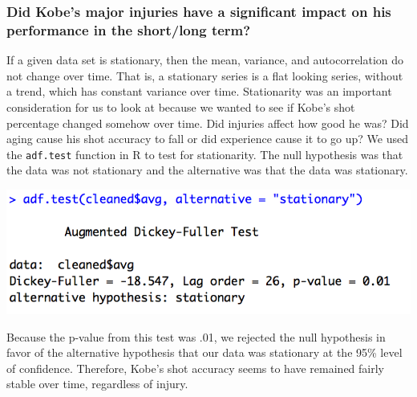 \documentclass[paper=a4, fontsize=11pt]{scrartcl} %
\numberwithin{equation}{section} %
\numberwithin{figure}{section} %
\numberwithin{table}{section} %
\begin{document}
\subsubsection{Did Kobe's major injuries have a significant impact on his performance in the short/long term?}
\hspace*{1cm}If a given data set is stationary, then the mean, variance, and autocorrelation do not change over time. That is, a stationary series is a flat looking series, without a trend, which has constant variance over time. Stationarity was an important consideration for us to look at because we wanted to see if Kobe's shot percentage changed somehow over time. Did injuries affect how good he was? Did aging cause his shot accuracy to fall or did experience cause it to go up? We used the \texttt{adf.test} function in R to test for stationarity. The null hypothesis was that the data was not stationary and the alternative was that the data was stationary. 
\begin{center}
	\includegraphics[scale=0.65]{img/stationarity}
\end{center}
\hspace*{1cm}Because the p-value from this test was .01, we rejected the null hypothesis in favor of the alternative hypothesis that our data was stationary at the 95\% level of confidence. Therefore, Kobe's shot accuracy seems to have remained fairly stable over time, regardless of injury. 
\end{document}

